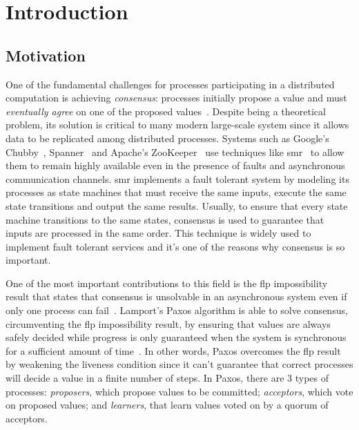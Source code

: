 
\chapter{Introduction}
\section{Motivation}
One of the fundamental challenges for processes participating in a distributed computation is achieving \emph{consensus}: processes initially propose a value and must \emph{eventually agree} on one of the proposed values~\cite{vukolic2012quorum}. Despite being a theoretical problem, its solution is critical to many modern large-scale system since it allows data to be replicated among distributed processes. Systems such as Google's Chubby~\cite{Burrows2006}, Spanner~\cite{Corbett2012} and Apache's ZooKeeper~\cite{Hunt2010} use techniques like \acrfull{smr}~\cite{time-clocks,Schneider1990} to allow them to remain highly available even in the presence of faults and asynchronous communication channels. \acrshort{smr} implements a fault tolerant system by modeling its processes as state machines that must receive the same inputs, execute the same state transitions and output the same results. Usually, to ensure that every state machine transitions to the same states, consensus is used to guarantee that inputs are processed in the same order. This technique is widely used to implement fault tolerant services and it's one of the reasons why consensus is so important.\par
One of the most important contributions to this field is the \acrfull{flp} impossibility result that states that consensus is unsolvable in an asynchronous system even if only one process can fail~\cite{Fischer1985}. Lamport's Paxos algorithm is able to solve consensus, circumventing the \acrshort{flp} impossibility result, by ensuring that values are always safely decided while progress is only guaranteed when the system is synchronous for a sufficient amount of time~\cite{Lamport2001}. In other words, Paxos overcomes the \acrshort{flp} result by weakening the liveness condition since it can't guarantee that correct processes will decide a value in a finite number of steps. In Paxos, there are 3 types of processes: \textit{proposers}, which propose values to be committed; \textit{acceptors}, which vote on proposed values; and \textit{learners}, that learn values voted on by a quorum of acceptors.\par
